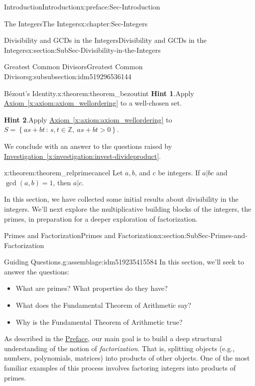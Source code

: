 \documentclass[oneside,10pt,]{book}
\newcommand{\blocktitlefont}{\relax}
\newcommand{\xreffont}{\relax}
\numberwithin{equation}{section}
\newcommand{\setof}[2]{{\left\{#1\,\colon\,#2\right\}}}
\def\Z{{\mathbb Z}}
\newcommand{\gt}{>}
\begin{document}
\begin{preface}{Introduction}{}{Introduction}{}{}{x:preface:Sec-Introduction}
\begin{chapterptx}{The Integers}{}{The Integers}{}{}{x:chapter:Sec-Integers}
\begin{sectionptx}{Divisibility and GCDs in the Integers}{}{Divisibility and GCDs in the Integers}{}{}{x:section:SubSec-Divisibility-in-the-Integers}
\begin{subsubsectionptx}{Greatest Common Divisors}{}{Greatest Common Divisors}{}{}{g:subsubsection:idm519296536144}
\begin{theorem}{Bézout's Identity.}{}{x:theorem:theorem_bezoutint}
\textbf{\blocktitlefont Hint 1}.\quad{}Apply \hyperref[x:axiom:axiom_wellordering]{Axiom~{\xreffont\ref{x:axiom:axiom_wellordering}}} to a well-chosen set.%
\par\smallskip%
\noindent

\textbf{\blocktitlefont Hint 2}.\quad{}Apply \hyperref[x:axiom:axiom_wellordering]{Axiom~{\xreffont\ref{x:axiom:axiom_wellordering}}} to \(S = \setof{as+bt}{s,t\in\Z, \ as+bt \gt 0}\).%
\end{theorem}
We conclude with an answer to the questions raised by \hyperref[x:investigation:invest-divideproduct]{Investigation~{\xreffont\ref{x:investigation:invest-divideproduct}}}.%
\begin{theorem}{}{}{x:theorem:theorem_relprimecancel}%
Let \(a, b\), and \(c\) be integers. If \(a|bc\) and \(\gcd(a,b) = 1\), then \(a|c\).%
\end{theorem}
\end{subsubsectionptx}
\begin{conclusion}{}%
In this section, we have collected some initial results about divisibility in the integers. We'll next explore the multiplicative building blocks of the integers, the primes, in preparation for a deeper exploration of factorization.%
\end{conclusion}%
\end{sectionptx}
%
%
\typeout{************************************************}
\typeout{************************************************}
%
\begin{sectionptx}{Primes and Factorization}{}{Primes and Factorization}{}{}{x:section:SubSec-Primes-and-Factorization}
\begin{assemblage}{Guiding Questions.}{g:assemblage:idm519235415584}%
In this section, we'll seek to answer the questions: %
\begin{itemize}[label=\textbullet]
\item{}What are primes? What properties do they have?%
\item{}What does the Fundamental Theorem of Arithmetic say?%
\item{}Why is the Fundamental Theorem of Arithmetic true?%
\end{itemize}
%
\end{assemblage}
As described in the \hyperref[x:preface:Sec-Introduction]{Preface}, our main goal is to build a deep structural understanding of the notion of \emph{factorization}. That is, splitting objects (e.g., numbers, polynomials, matrices) into products of other objects. One of the most familiar examples of this process involves factoring integers into products of primes.%

\end{sectionptx}
\end{chapterptx}
\end{preface}
\end{document}
